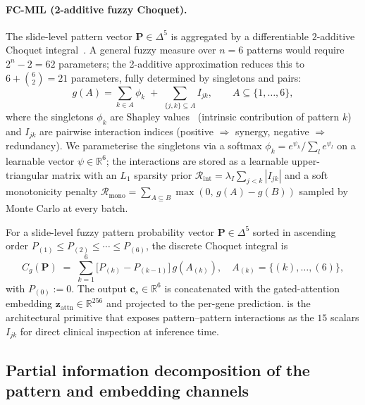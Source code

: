 \paragraph{FC-MIL (2-additive fuzzy Choquet).}
The slide-level pattern vector $\mathbf{P}\in\Delta^5$ is
aggregated by a differentiable
$2$-additive Choquet
integral~\cite{grabisch1996application,grabisch1997kapprox}.
A general fuzzy measure over $n\!=\!6$ patterns would require
$2^{n}\!-\!2\!=\!62$ parameters; the 2-additive approximation
reduces this to $6 + \binom{6}{2}\!=\!21$ parameters, fully
determined by singletons and pairs:
\begin{equation}
g(A) = \sum_{k\in A}\phi_k \;+\; \sum_{\{j,k\}\subseteq A} I_{jk},
\qquad A \subseteq \{1,\ldots,6\},
\label{eq:fuzzy_measure}
\end{equation}
where the singletons $\phi_k$ are Shapley
values~\cite{shapley1953value} (intrinsic contribution of pattern
$k$) and $I_{jk}$ are pairwise interaction indices
(positive $\Rightarrow$ synergy, negative $\Rightarrow$ redundancy).
We parameterise the singletons via a softmax
$\phi_k = e^{\psi_k}/\sum_l e^{\psi_l}$ on a learnable vector
$\psi\in\mathbb{R}^{6}$; the interactions are stored as a learnable
upper-triangular matrix with an $L_1$ sparsity prior
$\mathcal{R}_\text{int}=\lambda_I\sum_{j<k}|I_{jk}|$ and a soft
monotonicity penalty
$\mathcal{R}_\text{mono} =
\sum_{A\subseteq B}\max(0,\,g(A)\!-\!g(B))$
sampled by Monte Carlo at every batch.

For a slide-level fuzzy pattern probability vector
$\mathbf{P}\in\Delta^{5}$ sorted in ascending order
$P_{(1)}\!\leq\!P_{(2)}\!\leq\!\cdots\!\leq\!P_{(6)}$, the discrete
Choquet integral is
\begin{equation}
C_g(\mathbf{P}) \;=\; \sum_{k=1}^{6}
\bigl[P_{(k)}-P_{(k-1)}\bigr]\, g\!\left(A_{(k)}\right),
\quad A_{(k)} \!=\! \{(k),\ldots,(6)\},
\label{eq:choquet_integral}
\end{equation}
with $P_{(0)}\!:=\!0$.
The output $\mathbf{c}_s\in\mathbb{R}^{6}$ is concatenated with the
gated-attention embedding $\mathbf{z}_\mathrm{attn}\in\mathbb{R}^{256}$
and projected to the per-gene prediction.
\fcmil{} is the architectural primitive that exposes
pattern--pattern interactions as the $15$ scalars $I_{jk}$ for
direct clinical inspection at inference time.

\subsection*{Partial information decomposition of the pattern and
embedding channels}

